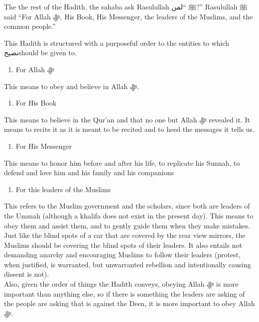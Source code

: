 \documentclass[
]{book}
\providecommand{\tightlist}{%
  \setlength{\itemsep}{0pt}\setlength{\parskip}{0pt}}
\begin{document}
The the rest of the Hadith, the sahaba ask Rasulullah ﷺ ``لمن?'' Rasulullah ﷺ said ``For Allah ﷻ, His Book, His Messenger, the leaders of the Muslims, and the common people.''

This Hadith is structured with a purposeful order to the entities to which نصيحshould be given to.

\begin{enumerate}
\def\labelenumi{\arabic{enumi}.}
\tightlist
\item
  For Allah ﷻ
\end{enumerate}

This means to obey and believe in Allah ﷻ.

\begin{enumerate}
\def\labelenumi{\arabic{enumi}.}
\setcounter{enumi}{1}
\tightlist
\item
  For His Book
\end{enumerate}

This means to believe in the Qur'an and that no one but Allah ﷻ revealed it. It means to recite it as it is meant to be recited and to heed the messages it tells us.

\begin{enumerate}
\def\labelenumi{\arabic{enumi}.}
\setcounter{enumi}{2}
\tightlist
\item
  For His Messenger
\end{enumerate}

This means to honor him before and after his life, to replicate his Sunnah, to defend and love him and his family and his companions

\begin{enumerate}
\def\labelenumi{\arabic{enumi}.}
\setcounter{enumi}{3}
\tightlist
\item
  For this leaders of the Muslims
\end{enumerate}

This refers to the Muslim government and the scholars, since both are leaders of the Ummah (although a khalifa does not exist in the present day). This means to obey them and assist them, and to gently guide them when they make mistakes. Just like the blind spots of a car that are covered by the rear view mirrors, the Muslims should be covering the blind spots of their leaders. It also entails not demanding anarchy and encouraging Muslims to follow their leaders (protest, when justified, is warranted, but unwarranted rebellion and intentionally causing dissent is not).\\
Also, given the order of things the Hadith conveys, obeying Allah ﷻ is more important than anything else, so if there is something the leaders are asking of the people are asking that is against the Deen, it is more important to obey Allah ﷻ.
\end{document}
